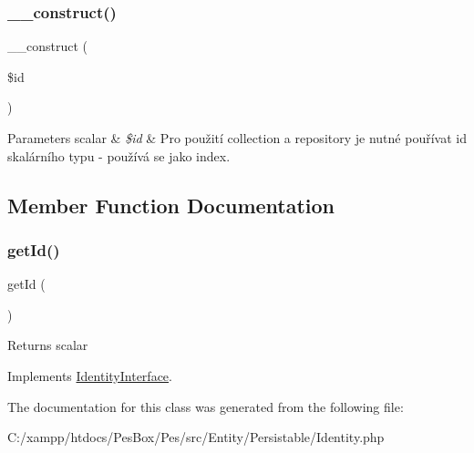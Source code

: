 \subsubsection{\texorpdfstring{\+\_\+\+\_\+construct()}{\_\_construct()}}
{\footnotesize\ttfamily \+\_\+\+\_\+construct (\begin{DoxyParamCaption}\item[{}]{\$id }\end{DoxyParamCaption})}


\begin{DoxyParams}[1]{Parameters}
scalar & {\em \$id} & Pro použití collection a repository je nutné pouřívat id skalárního typu -\/ používá se jako index. \\
\hline
\end{DoxyParams}


\subsection{Member Function Documentation}
\mbox{\label{class_pes_1_1_entity_1_1_persistable_1_1_identity_a12251d0c022e9e21c137a105ff683f13}} 
\subsubsection{\texorpdfstring{get\+Id()}{getId()}}
{\footnotesize\ttfamily get\+Id (\begin{DoxyParamCaption}{ }\end{DoxyParamCaption})}

\begin{DoxyReturn}{Returns}
scalar 
\end{DoxyReturn}


Implements \mbox{\hyperlink{interface_pes_1_1_entity_1_1_persistable_1_1_identity_interface_a12251d0c022e9e21c137a105ff683f13}{Identity\+Interface}}.



The documentation for this class was generated from the following file\+:\begin{DoxyCompactItemize}
\item 
C\+:/xampp/htdocs/\+Pes\+Box/\+Pes/src/\+Entity/\+Persistable/Identity.\+php\end{DoxyCompactItemize}
